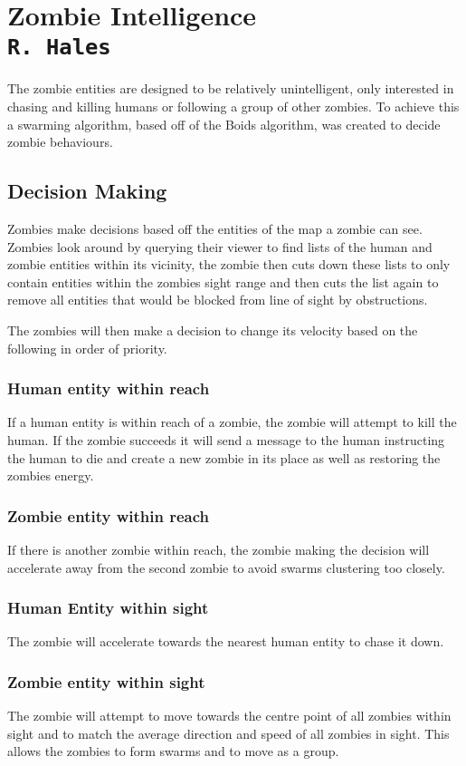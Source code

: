 \pagestyle{empty}
\section{Zombie Intelligence\\{\small\tt{R.~Hales}}}
\label{zombie_doc}
The zombie entities are designed to be relatively unintelligent, only interested in chasing and killing humans or following a group of other zombies. To achieve this a swarming algorithm, based off of the Boids algorithm,  was created to decide zombie behaviours.
\subsection{Decision Making}
Zombies make decisions based off the entities of the map a zombie can see. Zombies look around by querying their viewer to find lists of the human and zombie entities within its vicinity, the zombie then cuts down these lists to only contain entities within the zombies sight range and then cuts the list again to remove all entities that would be blocked from line of sight by obstructions.

The zombies will then make a decision to change its velocity based on the following in order of priority.
\subsubsection{Human entity within reach}
If a human entity is within reach of a zombie, the zombie will attempt to kill the human. If the zombie succeeds it will send a message to the human instructing the human to die and create a new zombie in its place as well as restoring the zombies energy.

\subsubsection{Zombie entity within reach}
If there is another zombie within reach, the zombie making the decision will accelerate away from the second zombie to avoid swarms clustering too closely.

\subsubsection{Human Entity within sight}
The zombie will accelerate towards the nearest human entity to chase it down.

\subsubsection{Zombie entity within sight}
The zombie will attempt to move towards the centre point of all zombies within sight and to match the average direction and speed of all zombies in sight. This allows the zombies to form swarms and to move as a group.

